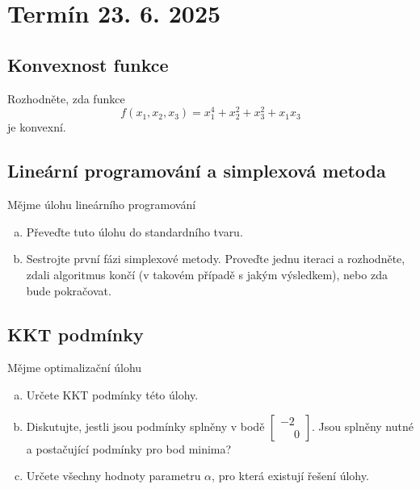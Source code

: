 \documentclass[11pt,a4paper]{article}
\begin{document}
\section*{Termín 23. 6. 2025}

\subsection*{Konvexnost funkce}
Rozhodněte, zda funkce
\[
    f(x_1, x_2, x_3) = x_1^4 + x_2^2 + x_3^2 + x_1 x_3
\]
je konvexní.

\subsection*{Lineární programování a simplexová metoda}
Mějme úlohu lineárního programování
\begin{enumerate}[(a)]
    \item Převeďte tuto úlohu do standardního tvaru.
    \item Sestrojte první fázi simplexové metody. Proveďte jednu iteraci a rozhodněte, zdali algoritmus končí (v takovém 
    případě s jakým výsledkem), nebo zda bude pokračovat.
\end{enumerate}

\subsection*{KKT podmínky}
Mějme optimalizační úlohu
\begin{enumerate}[(a)]
    \item Určete KKT podmínky této úlohy.
    \item Diskutujte, jestli jsou podmínky splněny v bodě $\begin{bmatrix}-2 \\ \phantom{-}0 \end{bmatrix}$. Jsou 
    splněny nutné a postačující podmínky pro bod minima?
    \item Určete všechny hodnoty parametru $\alpha$, pro která existují řešení úlohy.
\end{enumerate}
\end{document}
